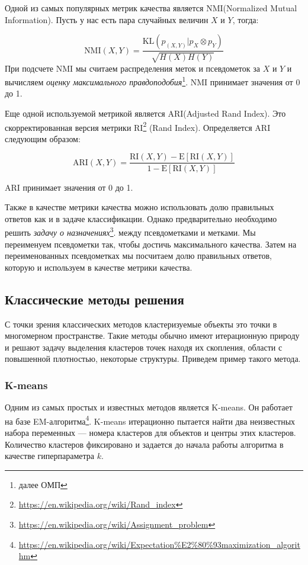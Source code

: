 \documentclass[a4paper,12pt]{extarticle}
\begin{document}
Одной из самых популярных метрик качества является NMI(Normalized Mutual Information).
Пусть у нас есть пара случайных величин $X$ и $Y$, тогда:

\[
	\text{NMI}(X,Y) = \frac{\text{KL}(p_{(X, Y)}| p_X \otimes p_Y)}{\sqrt{H(X)H(Y)}}
\]
При подсчете NMI мы считаем распределения меток и псевдометок 
за $X$ и $Y$ и вычисляем \textit{оценку максимального правдоподобия}\footnote{далее ОМП}. NMI 
принимает значения от 0 до 1.

Еще одной используемой метрикой является ARI(Adjusted Rand Index).
Это скорректированная версия метрики RI\footnote{\url{https://en.wikipedia.org/wiki/Rand_index}} (Rand Index).
Определяется ARI следующим образом:

\[
	\text{ARI}(X, Y) = \frac{\text{RI}(X, Y) - \text{E}[\text{RI}(X, Y)]}{1 - \text{E}[\text{RI}(X, Y)]}
\]

ARI принимает значения от 0 до 1.

Также в качестве метрики качества можно использовать долю 
правильных ответов как и в задаче классификации. Однако предварительно 
необходимо решить \textit{задачу о назначениях}\footnote{\url{https://en.wikipedia.org/wiki/Assignment_problem}}.
между псевдометками и метками.
Мы переименуем псевдометки так, чтобы достичь максимального качества.
Затем на переименованных псевдометках мы посчитаем долю правильных ответов, которую 
и используем в качестве метрики качества.

\subsection{Классические методы решения}

С точки зрения классических методов кластеризуемые
объекты это точки в многомерном пространстве. Такие
методы обычно имеют итерационную природу и решают 
задачу выделения кластеров точек находя их скопления, 
области с повышенной плотностью, некоторые структуры.
Приведем пример такого метода.

\subsubsection{K-means}

Одним из самых простых и известных методов является
K-means. Он работает на базе EM-алгоритма\footnote{\url{https://en.wikipedia.org/wiki/Expectation\%E2\%80\%93maximization_algorithm}}.
K-means итерационно пытается найти два неизвестных набора переменных ---
номера кластеров для объектов и центры этих кластеров. 
Количество кластеров фиксировано и задается до начала 
работы алгоритма в качестве гиперпараметра $k$.
\end{document}
